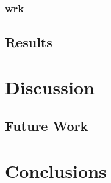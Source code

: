 \documentclass[twoside,openright]{uva-bachelor-thesis}
\begin{document}
\subsection{wrk}
\section{Results}

\chapter{Discussion}
\section{Future Work}
\chapter{Conclusions}


\printbibliography{}
\end{document}
